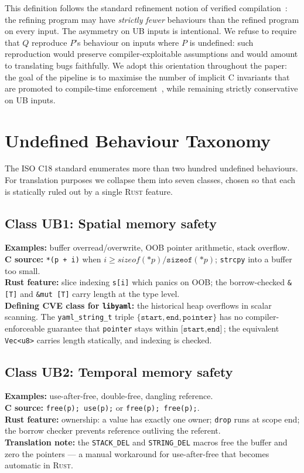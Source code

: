 \documentclass[12pt]{article}
\newcommand{\rust}{\textnormal{\textsc{Rust}}}
\newcommand{\libyaml}{\texttt{libyaml}}
\theoremstyle{definition}
\theoremstyle{remark}
\begin{document}
This definition follows the standard refinement notion of verified compilation~\cite{leroy2009}: the refining program may have \emph{strictly fewer} behaviours than the refined program on every input. The asymmetry on UB inputs is intentional. We refuse to require that \(Q\) reproduce \(P\)'s behaviour on inputs where \(P\) is undefined: such reproduction would preserve compiler-exploitable assumptions and would amount to translating bugs faithfully. We adopt this orientation throughout the paper: the goal of the pipeline is to maximise the number of implicit C invariants that are promoted to compile-time enforcement~\cite{long2026c2rust}, while remaining strictly conservative on UB inputs.

\section{Undefined Behaviour Taxonomy}
\label{sec:ub}

The ISO C18 standard enumerates more than two hundred undefined behaviours. For translation purposes we collapse them into seven classes, chosen so that each is statically ruled out by a single \rust{} feature.

\subsection{Class UB1: Spatial memory safety}
\textbf{Examples:} buffer overread/overwrite, OOB pointer arithmetic, stack overflow.\\
\textbf{C source:} \texttt{*(p + i)} when \(i \geq \mathit{sizeof}(\mathtt{*}p)/\mathtt{sizeof}(\mathtt{*}p)\); \texttt{strcpy} into a buffer too small.\\
\textbf{Rust feature:} slice indexing \texttt{s[i]} which panics on OOB; the borrow-checked \texttt{\&[T]} and \texttt{\&mut [T]} carry length at the type level.\\
\textbf{Defining CVE class for \libyaml{}:} the historical heap overflows in scalar scanning. The \texttt{yaml\_string\_t} triple \(\{\texttt{start}, \texttt{end}, \texttt{pointer}\}\) has no compiler-enforceable guarantee that \texttt{pointer} stays within \(\texttt{[start}, \texttt{end]}\); the equivalent \texttt{Vec<u8>} carries length statically, and indexing is checked.

\subsection{Class UB2: Temporal memory safety}
\textbf{Examples:} use-after-free, double-free, dangling reference.\\
\textbf{C source:} \texttt{free(p); use(p);} or \texttt{free(p); free(p);}.\\
\textbf{Rust feature:} ownership: a value has exactly one owner; \texttt{drop} runs at scope end; the borrow checker prevents reference outliving the referent.\\
\textbf{Translation note:} the \texttt{STACK\_DEL} and \texttt{STRING\_DEL} macros free the buffer and zero the pointers --- a manual workaround for use-after-free that becomes automatic in \rust{}.
\end{document}
